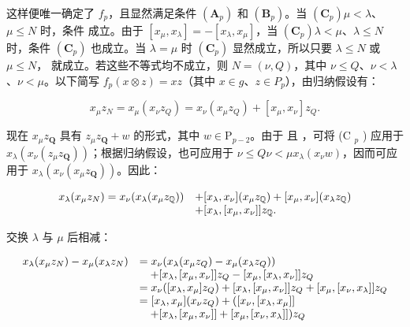 这样便唯一确定了 \(f_{p}\)，且显然满足条件 \((\mathbf{A}_{p})\) 和 \((\mathbf{B}_{p})\)。当 \((\mathbf{C}_{p})\)\(\mu < \lambda\)、\(\mu \leqslant N\) 时，条件  成立。由于 \([x_{\mu}, x_{\lambda}] = -[x_{\lambda}, x_{\mu}]\)，当 \((\mathbf{C}_{p})\)\(\lambda < \mu\)、\(\lambda \leqslant N\) 时，条件 \((\mathbf{C}_{p})\) 也成立。当 \(\lambda = \mu\) 时 \((\mathbf{C}_{p})\) 显然成立，所以只要 \(\lambda \leqslant N\) 或 \(\mu \leqslant N\)， 就成立。若这些不等式均不成立，则 \(N = (\nu, Q)\)，其中 \(\nu \leqslant Q\)、\(\nu < \lambda\)、\(\nu < \mu\)。以下简写 \(f_{p}(x \otimes z) = xz\)（其中 \(x \in g\)、\(z \in P_{p}\)），由归纳假设有：

\[
x _ {\mu} z _ {N} = x _ {\mu} (x _ {\nu} z _ {Q}) = x _ {\nu} (x _ {\mu} z _ {Q}) + [ x _ {\mu}, x _ {\nu} ] z _ {Q}.
\]

现在 \(x_{\mu}z_{\mathbf{Q}}\) 具有 \(z_{\mu}z_{\mathbf{Q}} + w\) 的形式，其中 \(w\in \mathrm{P}_{p - 2}\)。由于  且 ，可将 (C \(_{p}\) ) 应用于 \(x_{\lambda}(x_{\nu}(z_{\mu}z_{\mathbf{Q}}))\)；根据归纳假设，也可应用于 \(\nu \leqslant Q\)\(\nu < \mu\)\(x_{\lambda}(x_{\nu}w)\)，因而可应用于 \(x_{\lambda}(x_{\nu}(x_{\mu}z_{\mathbf{Q}}))\)。因此：

\[
\begin{array}{r l} x _ {\lambda} (x _ {\mu} z _ {N}) = x _ {\nu} (x _ {\lambda} (x _ {\mu} z _ {\mathbb {Q}})) & + [ x _ {\lambda}, x _ {\nu} ] (x _ {\mu} z _ {\mathbb {Q}}) + [ x _ {\mu}, x _ {\nu} ] (x _ {\lambda} z _ {\mathbb {Q}}) \\ & + [ x _ {\lambda}, [ x _ {\mu}, x _ {\nu} ] ] z _ {\mathbb {Q}}. \end{array}
\]

交换 \(\lambda\) 与 \(\mu\) 后相减：

\[
\begin{array}{r l} {x _ {\lambda} (x _ {\mu} z _ {N}) - x _ {\mu} (x _ {\lambda} z _ {N})} & {= x _ {\nu} (x _ {\lambda} (x _ {\mu} z _ {Q}) - x _ {\mu} (x _ {\lambda} z _ {Q}))} \\ & {\quad + [ x _ {\lambda}, [ x _ {\mu}, x _ {\nu} ] ] z _ {Q} - [ x _ {\mu}, [ x _ {\lambda}, x _ {\nu} ] ] z _ {Q}} \\ & {= x _ {\nu} ([ x _ {\lambda}, x _ {\mu} ] z _ {Q}) + [ x _ {\lambda}, [ x _ {\mu}, x _ {\nu} ] ] z _ {Q} + [ x _ {\mu}, [ x _ {\nu}, x _ {\lambda} ] ] z _ {Q}} \\ & {= [ x _ {\lambda}, x _ {\mu} ] (x _ {\nu} z _ {Q}) + ([ x _ {\nu}, [ x _ {\lambda}, x _ {\mu} ] ]} \\ & {\quad + [ x _ {\lambda}, [ x _ {\mu}, x _ {\nu} ] ] + [ x _ {\mu}, [ x _ {\nu}, x _ {\lambda} ] ]) z _ {Q}} \end{array}
\]


